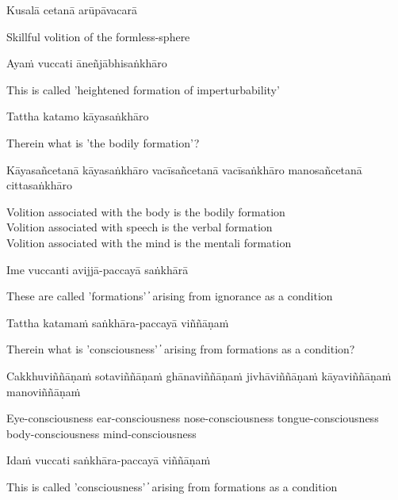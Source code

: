 Kusalā cetanā arūpāvacarā

\begin{cprenglish}
  Skillful volition of the formless-sphere
\end{cprenglish}

Ayaṁ vuccati āneñjābhisaṅkhāro

\begin{cprenglish}
  This is called 'heightened formation of imperturbability'
\end{cprenglish}

Tattha katamo kāyasaṅkhāro

\begin{cprenglish}
  Therein what is 'the bodily formation'?
\end{cprenglish}

Kāyasañcetanā kāyasaṅkhāro vacīsañcetanā vacīsaṅkhāro manosañcetanā cittasaṅkhāro

\begin{cprenglish}
  Volition associated with the body is the bodily formation\\
  Volition associated with speech is the verbal formation\\
  Volition associated with the mind is the mentali formation
\end{cprenglish}

Ime vuccanti avijjā-paccayā saṅkhārā

\begin{cprenglish}
  These are called 'formations'  ̓  arising from ignorance as a condition
\end{cprenglish}

Tattha katamaṁ saṅkhāra-paccayā viññāṇaṁ

\begin{cprenglish}
  Therein what is 'consciousness'  ̓  arising from formations as a condition?
\end{cprenglish}

Cakkhuviññāṇaṁ sotaviññāṇaṁ ghānaviññāṇaṁ jivhāviññāṇaṁ kāyaviññāṇaṁ manoviññāṇaṁ

\begin{cprenglish}
  Eye-consciousness ear-consciousness nose-consciousness tongue-consciousness body-consciousness mind-consciousness
\end{cprenglish}

Idaṁ vuccati saṅkhāra-paccayā viññāṇaṁ

\begin{cprenglish}
  This is called 'consciousness'  ̓  arising from formations as a condition
\end{cprenglish}

